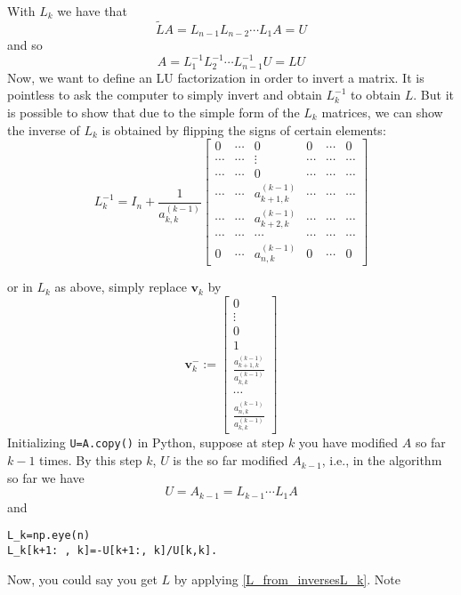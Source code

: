 \documentclass[12pt]{article}
\theoremstyle{definition}
\begin{document}
With $L_k$ we have that 
\begin{equation}
\tilde{L}A=L_{n-1}L_{n-2}\cdots L_1 A=U
\end{equation}
and so 
\begin{equation}\label{L_from_inversesL_k}
A=L_1^{-1}L_2^{-1}\cdots L_{n-1}^{-1} U=LU
\end{equation}
Now, we want to define an LU factorization in order to invert a matrix. It is pointless to ask the computer to simply invert and obtain $L_k^{-1}$ to obtain $L$. But it is possible to show that due to the simple form of the $L_k$ matrices, we can show the inverse of $L_k$ is obtained by flipping the signs of certain elements:
\begin{equation}
L_{k}^{-1}=I_n+\frac{1}{a_{k,k}^{(k-1)}}\begin{bmatrix}
0 & \cdots & 0 & 0 & \cdots & 0 \\ 
\cdots & \cdots & \vdots & \cdots & \cdots & \cdots \\ 
\cdots & \cdots & 0 & \cdots & \cdots & \cdots \\ 
\cdots & \cdots & a^{(k-1)}_{k+1,k} & \cdots & \cdots & \cdots \\ 
\cdots & \cdots & a^{(k-1)}_{k+2,k} & \cdots & \cdots & \cdots \\ 
\cdots & \cdots & \cdots & \cdots & \cdots & \cdots \\ 
0 & \cdots & a^{(k-1)}_{n,k} & 0 & \cdots & 0
\end{bmatrix} 
\end{equation}

or in $L_k$ as above, simply replace $\mathbf{v}_k$ by 
\begin{equation}\label{kth_col_inverse}
\mathbf{v}^{-}_{k}:=\begin{bmatrix}
0 \\ 
\vdots \\ 
0 \\ 
1 \\ 
 \frac{a_{k+1,k}^{(k-1)}}{a_{k,k}^{(k-1)}}\\ 
\cdots \\ 
\frac{a_{n,k}^{(k-1)}}{a_{k,k}^{(k-1)}}
\end{bmatrix} 
\end{equation}
Initializing \texttt{U=A.copy()} in Python, suppose at step $k$ you have modified $A$ so far $k-1$ times. By this step $k$, $U$ is the so far modified $A_{k-1}$, i.e., in the algorithm so far we have
\begin{equation}
U=A_{k-1}=L_{k-1}\cdots L_1 A 
\end{equation}
and
\begin{verbatim}
L_k=np.eye(n)
L_k[k+1: , k]=-U[k+1:, k]/U[k,k].
\end{verbatim}
Now, you could say you get $L$ by applying \eqref{L_from_inversesL_k}. Note
\end{document}
